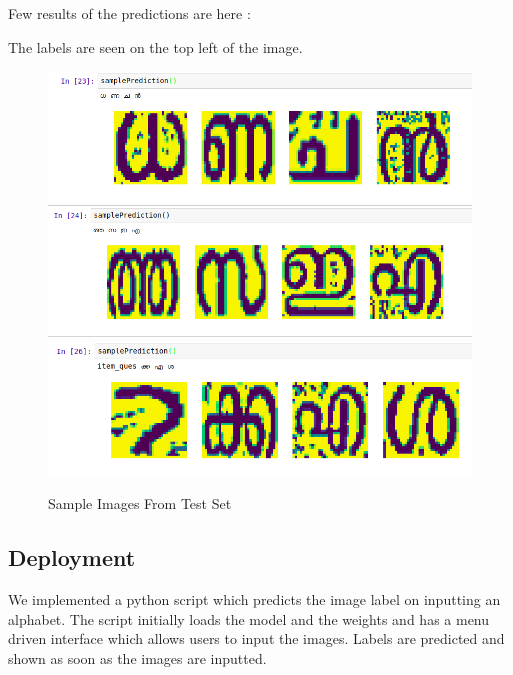 \documentclass[12pt]{report}
\begin{document}
Few results of the predictions are here :

The labels are seen on the top left of the image. 

\begin{figure}[h]
    \centering
    \includegraphics[width=\textwidth]{samp1.png}
    \includegraphics[width=\textwidth]{samp2.png}
    \includegraphics[width=\textwidth]{samp3.png}
    \caption{Sample Images From Test Set}
\end{figure}



\clearpage
\subsection*{Deployment}
We implemented a python script which predicts the image label on inputting an alphabet. The script initially loads the model and the weights and has a menu driven interface which allows users to input the images. Labels are predicted and shown as soon as the images are inputted.  
\end{document}
